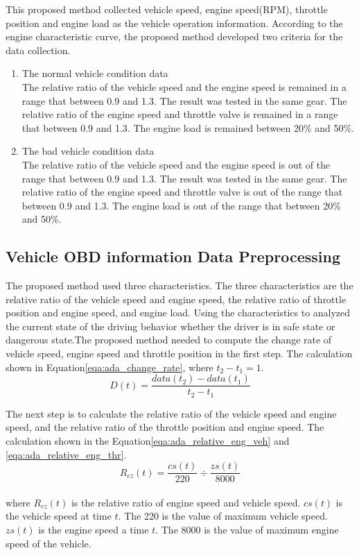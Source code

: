 This proposed method collected vehicle speed, engine speed(RPM), throttle position and engine load as the vehicle operation information. According to the engine characteristic curve, the proposed method developed two criteria for the data collection.

\begin{enumerate}
\item The normal vehicle condition data \\
The relative ratio of the vehicle speed and the engine speed is remained in a range that between 0.9 and 1.3. The result was tested in the same gear. The relative ratio of the engine speed and throttle valve is remained in a range that between 0.9 and 1.3. The engine load is remained between 20\% and 50\%.  
\item The bad vehicle condition data \\
The relative ratio of the vehicle speed and the engine speed is out of the range that between 0.9 and 1.3. The result was tested in the same gear. The relative ratio of the engine speed and throttle valve is out of the range that between 0.9 and 1.3. The engine load is out of the range that between 20\% and 50\%.
\end{enumerate}

\subsection{Vehicle OBD information Data Preprocessing}
The proposed method used three characteristics. The three characteristics are the relative ratio of the vehicle speed and engine speed, the relative ratio of throttle position and engine speed, and engine load. Using the characteristics to analyzed the current state of the driving behavior whether the driver is in safe state or dangerous state.The proposed method needed to compute the change rate of vehicle speed, engine speed and throttle position in the first step. The calculation shown in Equation\eqref{eqa:ada_change_rate}, where $t_{2} - t_{1} = 1$.\\
\begin{equation}
\label{eqa:ada_change_rate}
D(t) = \dfrac{data(t_{2})-data(t_{1})}{t_{2}-t_{1}}
\end{equation}

The next step is to calculate the relative ratio of the vehicle speed and engine speed, and the relative ratio of the throttle position and engine speed. The calculation shown in the Equation\eqref{eqa:ada_relative_eng_veh} and \eqref{eqa:ada_relative_eng_thr}. \\
\begin{equation}
\label{eqa:ada_relative_eng_veh}
R_{cz}(t) = \dfrac{cs(t)}{220} \div \dfrac{zs(t)}{8000}
\end{equation}
\\
where $R_{cz}(t)$ is the relative ratio of engine speed and vehicle speed. $cs(t)$ is the vehicle speed at time $t$. The 220 is the value of maximum vehicle speed. $zs(t)$ is the engine speed a time $t$. The 8000 is the value of maximum engine speed of the vehicle.\\

